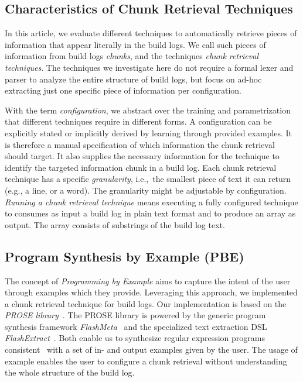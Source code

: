 \subsection{Characteristics of Chunk Retrieval Techniques}
\label{sec:crt-characteristics}
In this article, we evaluate different techniques to automatically
retrieve pieces of information that appear literally in the build
logs.
We call such pieces of information from build logs
\emph{chunks}, and the techniques \emph{chunk retrieval techniques}.
The techniques we investigate here do not require a formal lexer and
parser to analyze the entire structure of build logs, but focus on
ad-hoc extracting just one specific piece of information per
configuration.

With the term \textit{configuration}, we abstract over the training
and parametrization that different techniques require in different
forms.
A configuration can be explicitly stated or implicitly derived
by learning through provided examples.
It is therefore a manual
specification of which information the chunk retrieval should target.
It also supplies the necessary information for the technique to
identify the targeted information chunk in a build log.
Each chunk
retrieval technique has a specific \textit{granularity}, i.e.,\ the
smallest piece of text it can return (e.g., a line, or a word).
The
granularity might be adjustable by configuration.
\emph{Running a
chunk retrieval technique} means executing a fully configured
technique to consumes as input a build log in plain text format and to
produce an array as output.
The array consists of substrings of the
build log text.

\subsection{Program Synthesis by Example (PBE)}
The concept of \emph{Programming by Example} aims to capture the
intent of the user through examples which they provide.
Leveraging this approach, we implemented a chunk retrieval technique
for build logs.
Our implementation is based on the
\emph{PROSE library}~\cite{prose2019webpage}.
The PROSE library is powered by the generic program synthesis framework
\emph{FlashMeta}~\cite{polozov2015flashmeta:} and the specialized
text extraction DSL \emph{FlashExtract}~\cite{le2014flashextract:}.
Both enable us to synthesize regular expression programs
consistent~\cite{mitchell1982generalization} with a set of in-
and output examples given by the user.
The usage of example enables the user to configure a chunk
retrieval without understanding the whole structure of
the build log.

